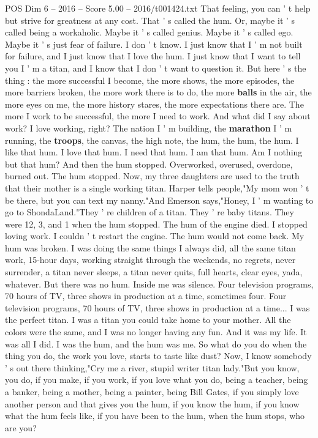 \begin{textsample}{POS Dim 6 – 2016 – Score 5.00 – 2016/t001424.txt}
That feeling, you can ' t help but strive for greatness at any cost.
That ' s called the hum.
Or, maybe it ' s called being a workaholic.
Maybe it ' s called genius.
Maybe it ' s called ego.
Maybe it ' s just fear of failure.
I don ' t know.
I just know that I ' m not built for failure, and I just know that I love the hum.
I just know that I want to tell you I ' m a titan, and I know that I don ' t want to question it.
But here ' s the thing : the more successful I become, the more shows, the more episodes, the more barriers broken, the more work there is to do, the more \textbf{balls} in the air, the more eyes on me, the more history stares, the more expectations there are.
The more I work to be successful, the more I need to work.
And what did I say about work?
I love working, right?
The nation I ' m building, the \textbf{marathon} I ' m running, the \textbf{troops}, the canvas, the high note, the hum, the hum, the hum.
I like that hum.
I love that hum.
I need that hum.
I am that hum.
Am I nothing but that hum?
And then the hum stopped.
Overworked, overused, overdone, burned out.
The hum stopped.
Now, my three daughters are used to the truth that their mother is a single working titan.
Harper tells people,"My mom won ' t be there, but you can text my nanny."And Emerson says,"Honey, I ' m wanting to go to ShondaLand."They ' re children of a titan.
They ' re baby titans.
They were 12, 3, and 1 when the hum stopped.
The hum of the engine died.
I stopped loving work.
I couldn ' t restart the engine.
The hum would not come back.
My hum was broken.
I was doing the same things I always did, all the same titan work, 15-hour days, working straight through the weekends, no regrets, never surrender, a titan never sleeps, a titan never quits, full hearts, clear eyes, yada, whatever.
But there was no hum.
Inside me was silence.
Four television programs, 70 hours of TV, three shows in production at a time, sometimes four.
Four television programs, 70 hours of TV, three shows in production at a time...
I was the perfect titan.
I was a titan you could take home to your mother.
All the colors were the same, and I was no longer having any fun.
And it was my life.
It was all I did.
I was the hum, and the hum was me.
So what do you do when the thing you do, the work you love, starts to taste like dust?
Now, I know somebody ' s out there thinking,"Cry me a river, stupid writer titan lady."But you know, you do, if you make, if you work, if you love what you do, being a teacher, being a banker, being a mother, being a painter, being Bill Gates, if you simply love another person and that gives you the hum, if you know the hum, if you know what the hum feels like, if you have been to the hum, when the hum stops, who are you?

\end{textsample}
